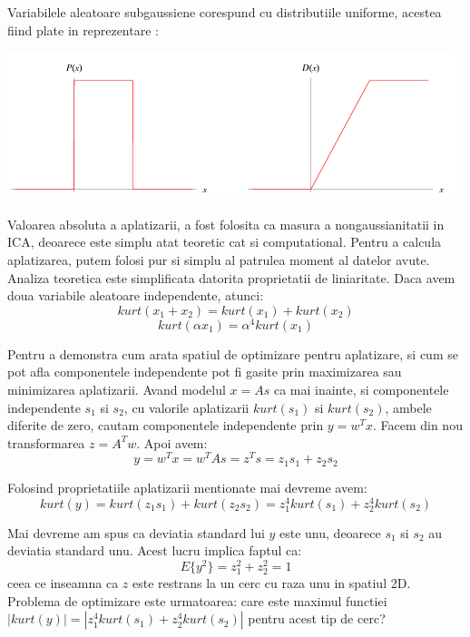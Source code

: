 \documentclass[12pt,oneside]{article}
\begin{document}
 Variabilele aleatoare subgaussiene corespund cu distributiile uniforme, acestea fiind plate in reprezentare \cite{uniform_distribution_wolfram}:

\begin{center}
	\includegraphics[scale=1.2]{uniform_distribution}
 \end{center}

Valoarea absoluta a aplatizarii, a fost folosita ca masura a nongaussianitatii in ICA, deoarece este simplu atat teoretic cat si computational. Pentru a calcula aplatizarea, putem folosi pur si simplu al patrulea moment al datelor avute. Analiza teoretica este simplificata datorita proprietatii de liniaritate. Daca avem doua variabile aleatoare independente, atunci:
\begin{equation}
kurt(x_1+x_2)=kurt(x_1)	+ kurt(x_2)
\end{equation}
\begin{equation}
kurt(\alpha x_1)=\alpha^4kurt(x_1)
\end{equation}

Pentru a demonstra cum arata spatiul de optimizare pentru aplatizare, si cum se pot afla componentele independente pot fi gasite prin maximizarea sau minimizarea aplatizarii. Avand modelul $x=As$ ca mai inainte, si componentele independente $s_1$ si $s_2$, cu valorile aplatizarii $kurt(s_1)$ si $kurt(s_2)$, ambele diferite de zero, cautam componentele independente prin $y=w^Tx$.
Facem din nou transformarea $z=A^Tw$. Apoi avem:
\begin{equation}
y=w^Tx=w^TAs=z^Ts=z_1s_1+z_2s_2
\end{equation}

Folosind proprietatiile aplatizarii mentionate mai devreme avem:
\begin{equation}
kurt(y)=kurt(z_1s_1)+kurt(z_2s_2)=z_1^4kurt(s_1)+z_2^4kurt(s_2)	
\end{equation}

Mai devreme am spus ca deviatia standard lui $y$ este unu, deoarece $s_1$ si $s_2$ au deviatia standard unu. Acest lucru implica faptul ca:
\begin{equation}
E\{y^2\}=z_1^2+z_2^2=1
\end{equation} 
ceea ce inseamna ca $z$ este restrans la un cerc cu raza unu in spatiul 2D. Problema de optimizare este urmatoarea: care este maximul functiei $|kurt(y)|=|z_1^4kurt(s_1)+z_2^4kurt(s_2)|$ pentru acest tip de cerc?
\end{document}
